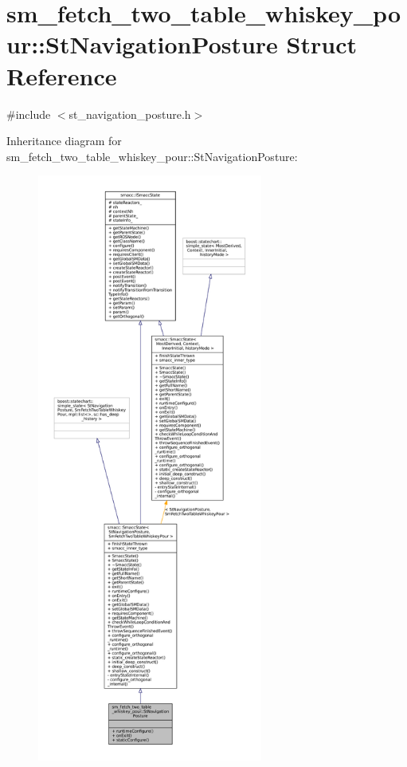 \hypertarget{structsm__fetch__two__table__whiskey__pour_1_1StNavigationPosture}{}\section{sm\+\_\+fetch\+\_\+two\+\_\+table\+\_\+whiskey\+\_\+pour\+:\+:St\+Navigation\+Posture Struct Reference}
\label{structsm__fetch__two__table__whiskey__pour_1_1StNavigationPosture}


{\ttfamily \#include $<$st\+\_\+navigation\+\_\+posture.\+h$>$}



Inheritance diagram for sm\+\_\+fetch\+\_\+two\+\_\+table\+\_\+whiskey\+\_\+pour\+:\+:St\+Navigation\+Posture\+:
\nopagebreak
\begin{figure}[H]
\begin{center}
\leavevmode
\includegraphics[height=550pt]{structsm__fetch__two__table__whiskey__pour_1_1StNavigationPosture__inherit__graph}
\end{center}
\end{figure}


